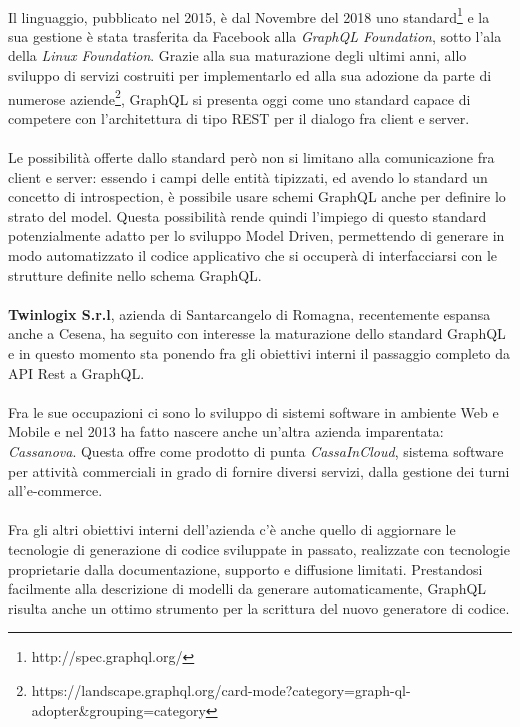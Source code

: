 \documentclass[a4paper, 12pt]{report}
\begin{document}
    \paragraph*{}
      Il linguaggio, pubblicato nel 2015, è dal Novembre del 2018 uno standard\footnote{http://spec.graphql.org/} e la sua gestione è stata trasferita da Facebook alla \emph{GraphQL Foundation}, sotto l'ala della \emph{Linux Foundation}.
      Grazie alla sua maturazione degli ultimi anni, allo sviluppo di servizi costruiti per implementarlo ed alla sua adozione da parte di numerose aziende\footnote{https://landscape.graphql.org/card-mode?category=graph-ql-adopter\&grouping=category}, GraphQL si presenta oggi come uno standard capace di competere con l'architettura di tipo REST per il dialogo fra client e server.
    \paragraph*{}
      Le possibilità offerte dallo standard però non si limitano alla comunicazione fra client e server: essendo i campi delle entità tipizzati, ed avendo lo standard un concetto di introspection, è possibile usare 
      schemi GraphQL anche per definire lo strato del model.
      Questa possibilità rende quindi l'impiego di questo standard potenzialmente adatto per lo sviluppo Model Driven, permettendo di generare in modo automatizzato il codice applicativo che si occuperà di interfacciarsi con le strutture definite nello schema GraphQL.
    \paragraph*{}
      \textbf{Twinlogix S.r.l}, azienda di Santarcangelo di Romagna, recentemente espansa anche a Cesena, ha seguito con interesse la maturazione dello standard GraphQL e in questo momento sta ponendo fra gli obiettivi interni il passaggio completo da API Rest a GraphQL.
    \paragraph*{}
      Fra le sue occupazioni ci sono lo sviluppo di sistemi software in ambiente Web e Mobile e nel 2013 ha fatto nascere anche un'altra azienda imparentata: \emph{Cassanova}.
      Questa offre come prodotto di punta \emph{CassaInCloud}, sistema software per attività commerciali in grado di fornire diversi servizi, dalla gestione dei turni all'e-commerce.
    \paragraph*{}
      Fra gli altri obiettivi interni dell'azienda c'è anche quello di aggiornare le tecnologie di generazione di codice sviluppate in passato, realizzate con tecnologie proprietarie dalla documentazione, supporto e diffusione limitati.
      Prestandosi facilmente alla descrizione di modelli da generare automaticamente, GraphQL risulta anche un ottimo strumento per la scrittura del nuovo generatore di codice.
\end{document}
